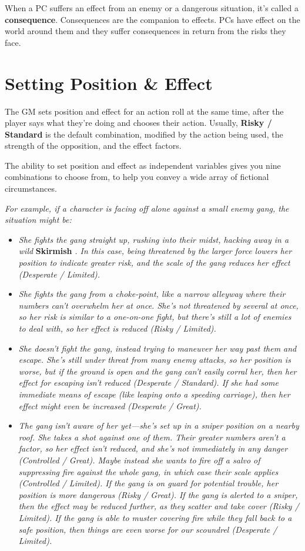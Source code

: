 \documentclass[11pt,fleqn,a5paper]{book}
\newcommand{\gameterm}[1]{\textbf{#1}}
\begin{document}
When a PC suffers an effect from an enemy or a dangerous situation, it’s called a \textbf{consequence}. Consequences are the companion to effects. PCs have effect on the world around them and they suffer consequences in return from the risks they face.

\chapter{Setting Position \& Effect}

The GM sets position and effect for an action roll at the same time, after the player says what they’re doing and chooses their action. Usually, \textbf{Risky / Standard} is the default combination, modified by the action being used, the strength of the opposition, and the effect factors.

The ability to set position and effect as independent variables gives you nine combinations to choose from, to help you convey a wide array of fictional circumstances.

\emph{For example, if a character is facing off alone against a small enemy gang, the situation might be:}

\begin{itemize}
	\item \emph{She fights the gang straight up, rushing into their midst, hacking away in a wild }\gameterm{Skirmish} \emph{. In this case, being threatened by the larger force lowers her position to indicate greater risk, and the scale of the gang reduces her effect (Desperate / Limited).}
	\item \emph{She fights the gang from a choke-point, like a narrow alleyway where their numbers can’t overwhelm her at once. She’s not threatened by several at once, so her risk is similar to a one-on-one fight, but there’s still a lot of enemies to deal with, so her effect is reduced (Risky / Limited).}
	\item \emph{She doesn’t fight the gang, instead trying to maneuver her way past them and escape. She’s still under threat from many enemy attacks, so her position is worse, but if the ground is open and the gang can’t easily corral her, then her effect for escaping isn’t reduced (Desperate / Standard). If she had some immediate means of escape (like leaping onto a speeding carriage), then her effect might even be increased (Desperate / Great).}
	\item \emph{The gang isn’t aware of her yet---she’s set up in a sniper position on a nearby roof. She takes a shot against one of them. Their greater numbers aren’t a factor, so her effect isn’t reduced, and she’s not immediately in any danger (Controlled / Great). Maybe instead she wants to fire off a salvo of suppressing fire against the whole gang, in which case their scale applies (Controlled / Limited). If the gang is on guard for potential trouble, her position is more dangerous (Risky / Great). If the gang is alerted to a sniper, then the effect may be reduced further, as they scatter and take cover (Risky / Limited). If the gang is able to muster covering fire while they fall back to a safe position, then things are even worse for our scoundrel (Desperate / Limited).}
\end{itemize}
\end{document}
